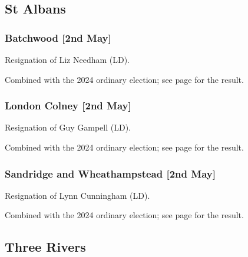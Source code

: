 \documentclass[a4paper,openany]{book}
\begin{document}
\begin{resultsiii}
\subsection*{St Albans}

\subsubsection*{Batchwood \hspace*{\fill}\nolinebreak[1]%
	\enspace\hspace*{\fill}
	[2nd May]}


Resignation of Liz Needham (LD).

Combined with the 2024 ordinary election; see page \pageref{StAlbansBatchwood} for the result.

\subsubsection*{London Colney \hspace*{\fill}\nolinebreak[1]%
	\enspace\hspace*{\fill}
	[2nd May]}


Resignation of Guy Gampell (LD).

Combined with the 2024 ordinary election; see page \pageref{StAlbansLondonColney} for the result.

\subsubsection*{Sandridge and Wheathampstead \hspace*{\fill}\nolinebreak[1]%
	\enspace\hspace*{\fill}
	[2nd May]}


Resignation of Lynn Cunningham (LD).

Combined with the 2024 ordinary election; see page \pageref{StAlbansSandridgeWheathampstead} for the result.

\subsection*{Three Rivers}


\end{resultsiii}
\end{document}
